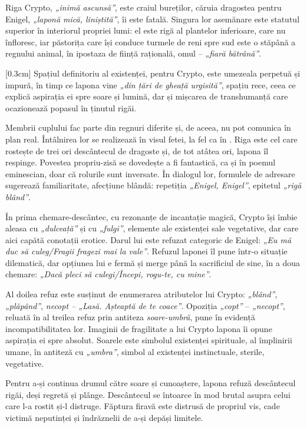 Riga Crypto, \textit{„inimă ascunsă”}, este craiul bureților, căruia dragostea pentru Enigel, \textit{„laponă mică, liniștită”}, îi este fatală. Singura lor asemănare este statutul superior în interiorul propriei lumi: el este rigă al plantelor inferioare, care nu înfloresc, iar păstorița care își conduce turmele de reni spre sud este o stăpână a regnului animal, în ipostaza de ființă rațională, omul -- \textit{„fiară bătrână”}.

[0.3cm]
Spațiul definitoriu al existenței, pentru Crypto, este umezeala perpetuă și impură, în timp ce lapona vine \textit{„din țări de gheață urgisită”}, spațiu rece, ceea ce explică aspirația ei spre soare și lumină, dar și mișcarea de transhumanță care ocazionează popasul în ținutul rigăi.

Membrii cuplului fac parte din regnuri diferite și, de aceea, nu pot comunica în plan real. Întâlnirea lor se realizează în visul fetei, la fel ca în . Riga este cel care rostește de trei ori descântecul de dragoste și, de tot atâtea ori, lapona îl respinge. Povestea propriu-zisă se dovedește a fi fantastică, ca și în poemul eminescian, doar că rolurile sunt inversate. În dialogul lor, formulele de adresare sugerează familiaritate, afecțiune blândă: repetiția \textit{„Enigel, Enigel”}, epitetul \textit{„rigă blând”}.

În prima chemare-descântec, cu rezonanțe de incantație magică, Crypto își îmbie aleasa cu \textit{„dulceață”} și cu \textit{„fulgi”}, elemente ale existenței sale vegetative, dar care aici capătă conotații erotice. Darul lui este refuzat categoric de Enigel: \textit{„Eu mă duc să culeg/Fragii fragezi mai la vale”}. Refuzul laponei îl pune într-o situație dilematică, dar opțiunea lui e fermă și merge până la sacrificiul de sine, în a doua chemare: \textit{„Dacă pleci să culegi/Începi, rogu-te, cu mine”}.

Al doilea refuz este susținut de enumerarea atributelor lui Crypto: \textit{„blând”}, \textit{„plăpând”}, \textit{necopt -- „Lasă. Așteaptă de te coace”}. Opoziția \textit{„copt”} -- \textit{„necopt”}, reluată în al treilea refuz prin antiteza \textit{soare-umbră}, pune în evidență incompatibilitatea lor. Imaginii de fragilitate a lui Crypto lapona îi opune aspirația ei spre absolut. Soarele este simbolul existenței spirituale, al împlinirii umane, în antiteză cu \textit{„umbra”}, simbol al existenței instinctuale, sterile, vegetative.

Pentru a-și continua drumul către soare și cunoaștere, lapona refuză descântecul rigăi, deși regretă și plânge. Descântecul se întoarce în mod brutal asupra celui care l-a rostit și-l distruge. Făptura firavă este distrusă de propriul vis, cade victimă neputinței și îndrăznelii de a-și depăși limitele.

